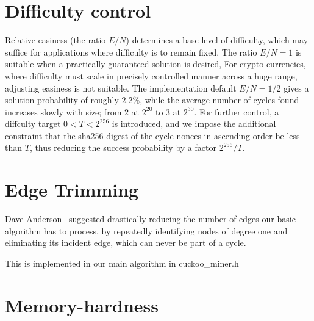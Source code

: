 \documentclass[11pt, oneside]{article}
\begin{document}
\section{Difficulty control}
Relative easiness (the ratio $E/N$) determines a base level of difficulty,
which may suffice for applications where difficulty is to remain fixed.
The ratio $E/N=1$ is suitable when a practically guaranteed solution is desired,
For crypto currencies, where difficulty must scale in precisely
controlled manner across a huge range, adjusting easiness is not suitable.
The implementation default $E/N=1/2$ gives a solution probability of roughly $2.2\%$,
while the average number of cycles found increases slowly with size; from 2 at $2^{20}$
to 3 at $2^{30}$.
For further control, a diffculty target $0 < T < 2^{256}$ is introduced,
and we impose the additional constraint that the sha256 digest of the
cycle nonces in ascending order be less than $T$, thus
reducing the success probability by a factor $2^{256}/T$.

\section{Edge Trimming}
Dave Anderson~\cite{dga2014} suggested drastically reducing the number of edges
our basic algorithm has to process, by repeatedly identifying nodes of degree one
and eliminating its incident edge, which can never be part of a cycle.

This is implemented in our main algorithm in cuckoo_miner.h

\section{Memory-hardness}
\end{document}
